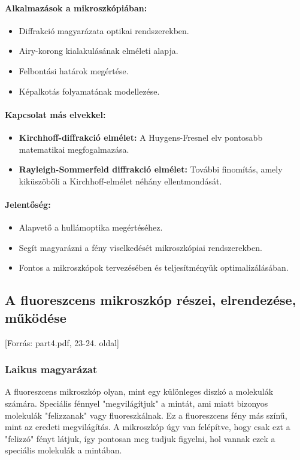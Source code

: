 \documentclass[a4paper,12pt]{article}
\begin{document}
\paragraph{Alkalmazások a mikroszkópiában:} 
\begin{itemize}
    \item Diffrakció magyarázata optikai rendszerekben.
    \item Airy-korong kialakulásának elméleti alapja.
    \item Felbontási határok megértése.
    \item Képalkotás folyamatának modellezése.
\end{itemize}

\paragraph{Kapcsolat más elvekkel:} 
\begin{itemize}
    \item \textbf{Kirchhoff-diffrakció elmélet:} A Huygens-Fresnel elv pontosabb matematikai megfogalmazása.
    \item \textbf{Rayleigh-Sommerfeld diffrakció elmélet:} További finomítás, amely kiküszöböli a Kirchhoff-elmélet néhány ellentmondását.
\end{itemize}

\paragraph{Jelentőség:} 
\begin{itemize}
    \item Alapvető a hullámoptika megértéséhez.
    \item Segít magyarázni a fény viselkedését mikroszkópiai rendszerekben.
    \item Fontos a mikroszkópok tervezésében és teljesítményük optimalizálásában.
\end{itemize}

\subsection{A fluoreszcens mikroszkóp részei, elrendezése, működése} [Forrás: part4.pdf, 23-24. oldal]

\subsubsection{Laikus magyarázat} A fluoreszcens mikroszkóp olyan, mint egy különleges diszkó a molekulák számára. Speciális fénnyel "megvilágítjuk" a mintát, ami miatt bizonyos molekulák "felizzanak" vagy fluoreszkálnak. Ez a fluoreszcens fény más színű, mint az eredeti megvilágítás. A mikroszkóp úgy van felépítve, hogy csak ezt a "felizzó" fényt látjuk, így pontosan meg tudjuk figyelni, hol vannak ezek a speciális molekulák a mintában.
\end{document}
